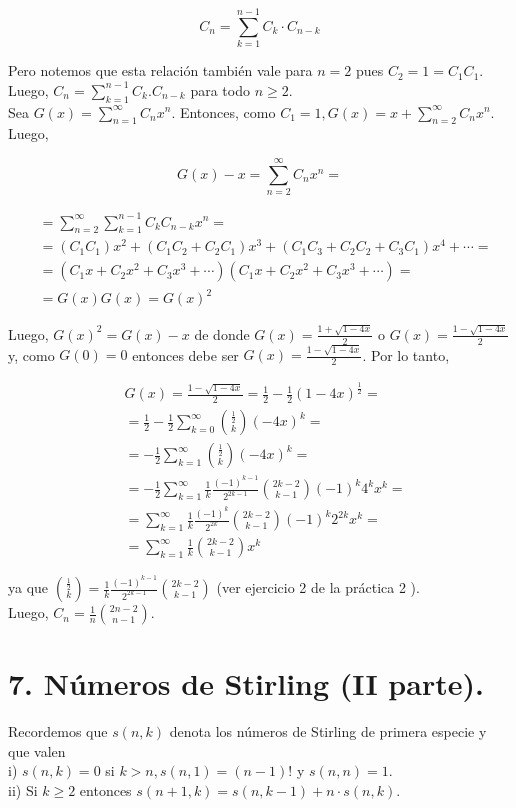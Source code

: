 \documentclass[10pt]{article}
\begin{document}
$$
C_{n}=\sum_{k=1}^{n-1} C_{k} \cdot C_{n-k}
$$

Pero notemos que esta relación también vale para $n=2$ pues $C_{2}=1=C_{1} C_{1}$. Luego, $C_{n}=\sum_{k=1}^{n-1} C_{k} . C_{n-k}$ para todo $n \geq 2$.\\
Sea $G(x)=\sum_{n=1}^{\infty} C_{n} x^{n}$. Entonces, como $C_{1}=1, G(x)=x+\sum_{n=2}^{\infty} C_{n} x^{n}$. Luego,

$$
G(x)-x=\sum_{n=2}^{\infty} C_{n} x^{n}=
$$

$$
\begin{aligned}
& =\sum_{n=2}^{\infty} \sum_{k=1}^{n-1} C_{k} C_{n-k} x^{n}= \\
& =\left(C_{1} C_{1}\right) x^{2}+\left(C_{1} C_{2}+C_{2} C_{1}\right) x^{3}+\left(C_{1} C_{3}+C_{2} C_{2}+C_{3} C_{1}\right) x^{4}+\cdots= \\
& =\left(C_{1} x+C_{2} x^{2}+C_{3} x^{3}+\cdots\right)\left(C_{1} x+C_{2} x^{2}+C_{3} x^{3}+\cdots\right)= \\
& =G(x) G(x)=G(x)^{2}
\end{aligned}
$$

Luego, $G(x)^{2}=G(x)-x$ de donde $G(x)=\frac{1+\sqrt{1-4 x}}{2}$ o $G(x)=\frac{1-\sqrt{1-4 x}}{2}$ y, como $G(0)=0$ entonces debe ser $G(x)=\frac{1-\sqrt{1-4 x}}{2}$. Por lo tanto,

$$
\begin{aligned}
& G(x)=\frac{1-\sqrt{1-4 x}}{2}=\frac{1}{2}-\frac{1}{2}(1-4 x)^{\frac{1}{2}}= \\
& =\frac{1}{2}-\frac{1}{2} \sum_{k=0}^{\infty}\binom{\frac{1}{2}}{k}(-4 x)^{k}= \\
& =-\frac{1}{2} \sum_{k=1}^{\infty}\binom{\frac{1}{2}}{k}(-4 x)^{k}= \\
& =-\frac{1}{2} \sum_{k=1}^{\infty} \frac{1}{k} \frac{(-1)^{k-1}}{2^{2 k-1}}\binom{2 k-2}{k-1}(-1)^{k} 4^{k} x^{k}= \\
& =\sum_{k=1}^{\infty} \frac{1}{k} \frac{(-1)^{k}}{2^{2 k}}\binom{2 k-2}{k-1}(-1)^{k} 2^{2 k} x^{k}= \\
& =\sum_{k=1}^{\infty} \frac{1}{k}\binom{2 k-2}{k-1} x^{k}
\end{aligned}
$$

ya que $\binom{\frac{1}{2}}{k}=\frac{1}{k} \frac{(-1)^{k-1}}{2^{2 k-1}}\binom{2 k-2}{k-1}$ (ver ejercicio 2 de la práctica 2 ).\\
Luego, $C_{n}=\frac{1}{n}\binom{2 n-2}{n-1}$.

\section*{7. Números de Stirling (II parte).}
Recordemos que $s(n, k)$ denota los números de Stirling de primera especie y que valen\\
i) $s(n, k)=0$ si $k>n, s(n, 1)=(n-1)!$ y $s(n, n)=1$.\\
ii) Si $k \geq 2$ entonces $s(n+1, k)=s(n, k-1)+n \cdot s(n, k)$.
\end{document}
